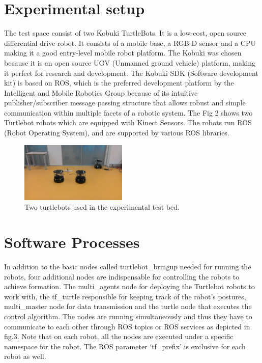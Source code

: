 \documentclass[journal]{IEEEtran}
\begin{document}
\section{Experimental setup}

The test space consist of two Kobuki TurtleBots. It is a low-cost, open source differential drive robot. It consists of a mobile base, a RGB-D sensor and a CPU making it a good  entry-level mobile robot platform. The Kobuki was chosen because it is an open source UGV (Unmanned ground vehicle) platform, making it perfect for research and development. The Kobuki SDK (Software development kit) is based on ROS, which is the preferred development platform by the Intelligent and Mobile Robotics Group because of its intuitive publisher/subscriber message passing structure that allows robust and simple communication within multiple  facets of a robotic system. The Fig 2 shows two Turtlebot robots which are equipped with Kinect Sensors. The robots run ROS (Robot Operating System), and are supported by various ROS libraries. 

\begin{figure}[!h]
\begin{center}
\includegraphics[width=2in]{two.jpg}
\caption{Two turtlebots used in the experimental test bed.}
\end{center}
\label{fig:mypicture2}
\end{figure}









\section{Software Processes}

In addition to the basic nodes called turtlebot{\_}bringup needed for running the robots, four additional nodes are indispensable for controlling the robots to achieve formation. 
The multi{\_}agents node for deploying the Turtlebot robots to work with, the tf{\_}turtle responsible for keeping track of the robot's postures, multi{\_}master node for data transmission and the turtle node that executes the control algorithm. The nodes are running simultaneously and thus they have to communicate to each other through ROS topics or ROS services as depicted in fig.3. Note that on each robot, all the nodes are executed under a specific namespace for the robot. The ROS parameter ‘tf{\_}prefix’ is exclusive for each robot as well.
\end{document}
